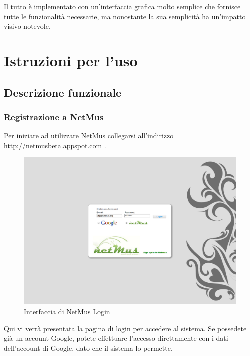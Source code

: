 Il tutto \`e implementato con un'interfaccia grafica molto semplice che fornisce
tutte le funzionalit\`a necessarie, ma nonostante la sua semplicit\`a ha
un'impatto visivo notevole.
\chapter{Istruzioni per l'uso}
\thispagestyle{fancy}

\section{Descrizione funzionale}

\subsection{Registrazione a NetMus}
Per iniziare ad utilizzare NetMus collegarsi all'indirizzo
\url{http://netmusbeta.appspot.com} . \\
\begin{figure}[htbp]
  \centering
  \includegraphics[width=15cm]{img/MU/login.png}
\caption{Interfaccia di NetMus Login}
\end{figure}
Qui vi verr\`a presentata la pagina di login per
accedere al sistema. Se possedete gi\`a un account Google, potete effettuare
l'accesso direttamente con i dati dell'account di Google, dato che il sistema
lo permette.\\
